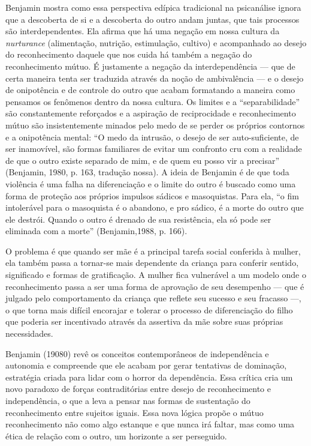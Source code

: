 Benjamin mostra como essa perspectiva edípica tradicional na psicanálise
ignora que a descoberta de si e a descoberta do outro andam juntas, que
tais processos são interdependentes. Ela afirma que há uma negação em
nossa cultura da \emph{nurturance} (alimentação, nutrição, estimulação,
cultivo) e acompanhado ao desejo do reconhecimento daquele que nos cuida
há também a negação do reconhecimento mútuo. É justamente a negação da
interdependência --- que de certa maneira tenta ser traduzida através da
noção de ambivalência --- e o desejo de onipotência e de controle do
outro que acabam formatando a maneira como pensamos os fenômenos dentro
da nossa cultura. Os limites e a ``separabilidade'' são constantemente
reforçados e a aspiração de reciprocidade e reconhecimento mútuo são
insistentemente minados pelo medo de se perder os próprios contornos e a
onipotência mental: ``O medo da intrusão, o desejo de ser
auto-suficiente, de ser inamovível, são formas familiares de evitar um
confronto cru com a realidade de que o outro existe separado de mim, e
de quem eu posso vir a precisar'' (Benjamin, 1980, p. 163, tradução
nossa). A ideia de Benjamin é de que toda violência é uma falha na
diferenciação e o limite do outro é buscado como uma forma de proteção
aos próprios impulsos sádicos e masoquistas. Para ela, ``o fim
intolerável para o masoquista é o abandono, e pro sádico, é a morte do
outro que ele destrói. Quando o outro é drenado de sua resistência, ela
só pode ser eliminada com a morte'' (Benjamin,1988, p. 166).

O problema é que quando ser mãe é a principal tarefa social conferida à
mulher, ela também passa a tornar-se mais dependente da criança para
conferir sentido, significado e formas de gratificação. A mulher fica
vulnerável a um modelo onde o reconhecimento passa a ser uma forma de
aprovação de seu desempenho --- que é julgado pelo comportamento da
criança que reflete seu sucesso e seu fracasso ---, o que torna mais
difícil encorajar e tolerar o processo de diferenciação do filho que
poderia ser incentivado através da assertiva da mãe sobre suas próprias
necessidades.

Benjamin (19080) revê os conceitos contemporâneos de independência e
autonomia e compreende que ele acabam por gerar tentativas de dominação,
estratégia criada para lidar com o horror da dependência. Essa crítica
cria um novo paradoxo de forças contraditórias entre desejo de
reconhecimento e independência, o que a leva a pensar nas formas de
sustentação do reconhecimento entre sujeitos iguais. Essa nova lógica
propõe o mútuo reconhecimento não como algo estanque e que nunca irá
faltar, mas como uma ética de relação com o outro, um horizonte a ser
perseguido.

